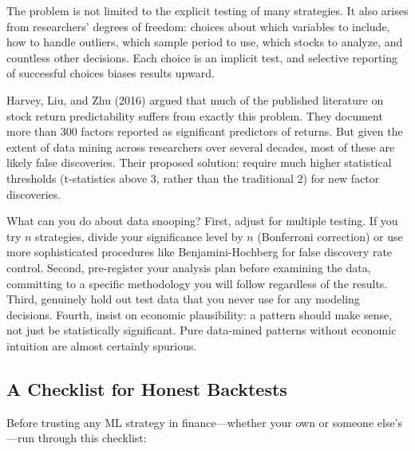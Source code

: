 \documentclass[11pt,a4paper]{article}
\begin{document}
The problem is not limited to the explicit testing of many strategies. It also arises from researchers' degrees of freedom: choices about which variables to include, how to handle outliers, which sample period to use, which stocks to analyze, and countless other decisions. Each choice is an implicit test, and selective reporting of successful choices biases results upward.

Harvey, Liu, and Zhu (2016) argued that much of the published literature on stock return predictability suffers from exactly this problem. They document more than 300 factors reported as significant predictors of returns. But given the extent of data mining across researchers over several decades, most of these are likely false discoveries. Their proposed solution: require much higher statistical thresholds (t-statistics above 3, rather than the traditional 2) for new factor discoveries.

What can you do about data snooping? First, adjust for multiple testing. If you try $n$ strategies, divide your significance level by $n$ (Bonferroni correction) or use more sophisticated procedures like Benjamini-Hochberg for false discovery rate control. Second, pre-register your analysis plan before examining the data, committing to a specific methodology you will follow regardless of the results. Third, genuinely hold out test data that you never use for any modeling decisions. Fourth, insist on economic plausibility: a pattern should make sense, not just be statistically significant. Pure data-mined patterns without economic intuition are almost certainly spurious.

\subsection{A Checklist for Honest Backtests}

Before trusting any ML strategy in finance---whether your own or someone else's---run through this checklist:
\end{document}

